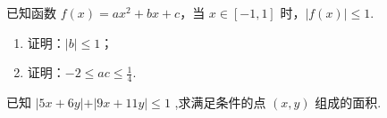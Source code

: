 \documentclass[a4paper , final]{ctexart}
\newenvironment{problem}[1]{%
  \item #1
  \par
  \vspace{8cm}
}{}
\begin{document}
\begin{problems}
  \begin{problem}
  {
    已知函数 $f(x) = ax^2 + bx + c$，当 $x \in [-1, 1]$ 时，$|f(x)| \le 1$.
    \begin{enumerate}[label=(\arabic*)]
      \item 证明：$|b| \le 1$；
      \item 证明：$-2 \le ac \le \frac{1}{4}$.
    \end{enumerate}
  }
\end{problem}

\begin{problem}
  {
    已知 $\vert 5x+6y\vert +\vert 9x+11y\vert \leq 1$ ,求满足条件的点 $(x,y)$ 组成的面积.
  }
\end{problem}
\end{problems}
\end{document}
